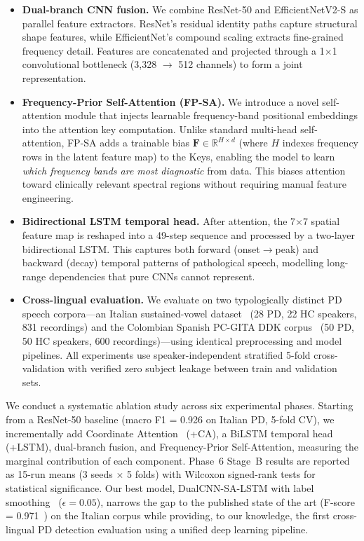 \documentclass[conference]{IEEEtran}
\begin{document}
\begin{itemize}
    \item \textbf{Dual-branch CNN fusion.} We combine ResNet-50 and EfficientNetV2-S as parallel feature extractors. ResNet's residual identity paths capture structural shape features, while EfficientNet's compound scaling extracts fine-grained frequency detail. Features are concatenated and projected through a 1$\times$1 convolutional bottleneck (3{,}328 $\rightarrow$ 512 channels) to form a joint representation.

    \item \textbf{Frequency-Prior Self-Attention (FP-SA).} We introduce a novel self-attention module that injects learnable frequency-band positional embeddings into the attention key computation. Unlike standard multi-head self-attention, FP-SA adds a trainable bias $\mathbf{F} \in \mathbb{R}^{H \times d}$ (where $H$ indexes frequency rows in the latent feature map) to the Keys, enabling the model to learn \textit{which frequency bands are most diagnostic} from data. This biases attention toward clinically relevant spectral regions without requiring manual feature engineering.

    \item \textbf{Bidirectional LSTM temporal head.} After attention, the 7$\times$7 spatial feature map is reshaped into a 49-step sequence and processed by a two-layer bidirectional LSTM. This captures both forward (onset$\rightarrow$peak) and backward (decay) temporal patterns of pathological speech, modelling long-range dependencies that pure CNNs cannot represent.

    \item \textbf{Cross-lingual evaluation.} We evaluate on two typologically distinct PD speech corpora---an Italian sustained-vowel dataset~\cite{dimauro2019} (28 PD, 22 HC speakers, 831 recordings) and the Colombian Spanish PC-GITA DDK corpus~\cite{orozco2014} (50 PD, 50 HC speakers, 600 recordings)---using identical preprocessing and model pipelines. All experiments use speaker-independent stratified 5-fold cross-validation with verified zero subject leakage between train and validation sets.
\end{itemize}

We conduct a systematic ablation study across six experimental phases. Starting from a ResNet-50 baseline (macro F1 = 0.926 on Italian PD, 5-fold CV), we incrementally add Coordinate Attention~\cite{hou2021} (+CA), a BiLSTM temporal head~\cite{graves2005} (+LSTM), dual-branch fusion, and Frequency-Prior Self-Attention, measuring the marginal contribution of each component. Phase~6 Stage~B results are reported as 15-run means (3 seeds $\times$ 5 folds) with Wilcoxon signed-rank tests for statistical significance. Our best model, DualCNN-SA-LSTM with label smoothing~\cite{szegedy2016} ($\epsilon = 0.05$), narrows the gap to the published state of the art (F-score = 0.971~\cite{aversano2024}) on the Italian corpus while providing, to our knowledge, the first cross-lingual PD detection evaluation using a unified deep learning pipeline.
\end{document}
